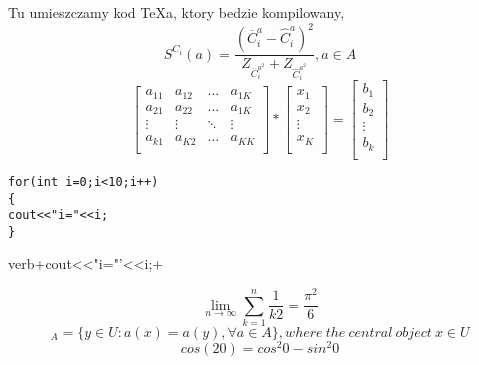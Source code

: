 \documentclass{article}
\begin{document}
Tu umieszczamy kod TeXa, ktory bedzie kompilowany,
\begin{displaymath}
S^{C_{i}}(a)=\frac{(\overline{C}^{a}_{i}-\widehat{C}^{a}_{i})^2}{Z_{\overline{C}^{{a}^2}_{i}}+Z_{\widehat{C}^{a^2}_{i}}}, a \in A
\end{displaymath}
\begin{equation}
\left[
\begin{array} {cccc}
a_{11} & a_{12} & \ldots & a_{1K} \\
a_{21} & a_{22} & \ldots & a_{1K} \\
\vdots & \vdots & \ddots & \vdots \\
a_{k1} & a_{K2} & \ldots & a_{KK} \\
\end{array}
\right]*
\left[
\begin{array}{c}
x_{1} \\
x_{2} \\
\vdots \\
x_K \\
\end{array}
\right]=
\left[
\begin{array}{c}
b_1 \\
b_2 \\
\vdots \\
b_k \\
\end{array}
\right]
\end{equation}
\begin{verbatim}
for(int i=0;i<10;i++)
{
cout<<"i="<<i;
}
\end{verbatim}
\begin{algorithmic}
\item{verb+cout<<"i="'<<i;+}
\ENDFOR
\end{algorithmic}
\begin{displaymath}
\lim_{n\rightarrow\infty} \sum^{n}_{k=1}\frac{1}{k2}=\frac{\pi^2}{6}
\end{displaymath}
\begin{displaymath}
[x]_A = \{y \in U : a(x) = a(y), \forall a \in A\}, where\ the\ central\ object\ x \in U
\end{displaymath}
\begin{displaymath}
cos(20)=cos^2 0 - sin^2 0
\end{displaymath}
\end{document}
